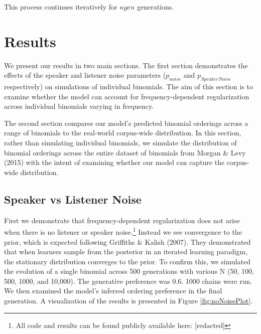 \documentclass[10pt, letterpaper]{article}
\begin{document}
This process continues iteratively for \(ngen\) generations.

\hypertarget{results}{%
\section{Results}\label{results}}

We present our results in two main sections. The first section
demonstrates the effects of the speaker and listener noise parameters
(\(p_{noise}\) and \(p_{SpeakerNoise}\) respectively) on simulations of
individual binomials. The aim of this section is to examine whether the
model can account for frequency-dependent regularization across
individual binomials varying in frequency.

The second section compares our model's predicted binomial orderings
across a range of binomials to the real-world corpus-wide distribution.
In this section, rather than simulating individual binomials, we
simulate the distribution of binomial orderings across the entire
dataset of binomials from Morgan \& Levy (2015) with the intent of
examining whether our model can capture the corpus-wide distribution.

\hypertarget{speaker-vs-listener-noise}{%
\subsection{Speaker vs Listener Noise}\label{speaker-vs-listener-noise}}

First we demonstrate that frequency-dependent regularization does not
arise when there is no listener or speaker noise.\footnote{All code and
  results can be found publicly available here: {[}redacted{]}} Instead
we see convergence to the prior, which is expected following Griffiths
\& Kalish (2007). They demonstrated that when learners sample from the
posterior in an iterated learning paradigm, the stationary distribution
converges to the prior. To confirm this, we simulated the evolution of a
single binomial across 500 generations with various N (50, 100, 500,
1000, and 10,000). The generative preference was 0.6. 1000 chains were
run. We then examined the model's inferred ordering preference in the
final generation. A visualization of the results is presented in Figure
\ref{fig:noNoisePlot}.
\end{document}
